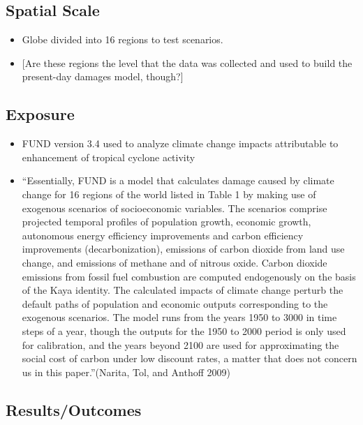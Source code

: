 \documentclass[
]{article}
\providecommand{\tightlist}{%
  \setlength{\itemsep}{0pt}\setlength{\parskip}{0pt}}
\begin{document}
\hypertarget{spatial-scale-21}{%
\subsection{Spatial Scale}\label{spatial-scale-21}}

\begin{itemize}
\tightlist
\item
  Globe divided into 16 regions to test scenarios.
\item
  {[}Are these regions the level that the data was collected and used to
  build the present-day damages model, though?{]}
\end{itemize}

\hypertarget{exposure-20}{%
\subsection{Exposure}\label{exposure-20}}

\begin{itemize}
\tightlist
\item
  FUND version 3.4 used to analyze climate change impacts attributable
  to enhancement of tropical cyclone activity
\item
  ``Essentially, FUND is a model that calculates damage caused by
  climate change for 16 regions of the world listed in Table 1 by making
  use of exogenous scenarios of socioeconomic variables. The scenarios
  comprise projected temporal profiles of population growth, economic
  growth, autonomous energy efficiency improvements and carbon
  efficiency improvements (decarbonization), emissions of carbon dioxide
  from land use change, and emissions of methane and of nitrous oxide.
  Carbon dioxide emissions from fossil fuel combustion are computed
  endogenously on the basis of the Kaya identity. The calculated impacts
  of climate change perturb the default paths of population and economic
  outputs corresponding to the exogenous scenarios. The model runs from
  the years 1950 to 3000 in time steps of a year, though the outputs for
  the 1950 to 2000 period is only used for calibration, and the years
  beyond 2100 are used for approximating the social cost of carbon under
  low discount rates, a matter that does not concern us in this
  paper.''(Narita, Tol, and Anthoff 2009)
\end{itemize}

\hypertarget{resultsoutcomes-16}{%
\subsection{Results/Outcomes}\label{resultsoutcomes-16}}
\end{document}
